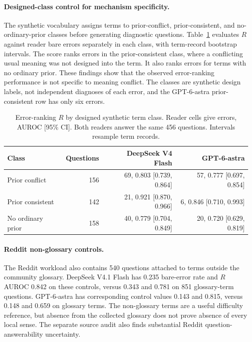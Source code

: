 \paragraph{Designed-class control for mechanism specificity.}\label{app:synthetic-control}
The synthetic vocabulary assigns terms to prior-conflict, prior-consistent, and no-ordinary-prior classes before generating diagnostic questions. Table~\ref{tab:synthetic-control} evaluates $R$ against reader bare errors separately in each class, with term-record bootstrap intervals. The score ranks errors in the prior-consistent class, where a conflicting usual meaning was not designed into the term. It also ranks errors for terms with no ordinary prior. These findings show that the observed error-ranking performance is not specific to meaning conflict. The classes are synthetic design labels, not independent diagnoses of each error, and the GPT-6-astra prior-consistent row has only six errors.

\begin{table}[h]\centering\small
\caption{Error-ranking $R$ by designed synthetic term class. Reader cells give errors, AUROC [95\% CI]. Both readers answer the same 456 questions. Intervals resample term records.}
\label{tab:synthetic-control}
\begin{tabular}{@{}lrrr@{}}\toprule
Class & Questions & DeepSeek V4 Flash & GPT-6-astra\\\midrule
Prior conflict & 156 & 69, 0.803 [0.739, 0.864] & 57, 0.777 [0.697, 0.854]\\
Prior consistent & 142 & 21, 0.921 [0.870, 0.966] & 6, 0.846 [0.710, 0.993]\\
No ordinary prior & 158 & 40, 0.779 [0.704, 0.849] & 20, 0.720 [0.629, 0.819]\\\bottomrule
\end{tabular}
\end{table}

\paragraph{Reddit non-glossary controls.}
The Reddit workload also contains 540 questions attached to terms outside the community glossary. DeepSeek V4.1 Flash has 0.235 bare-error rate and $R$ AUROC 0.842 on these controls, versus 0.343 and 0.781 on 851 glossary-term questions. GPT-6-astra has corresponding control values 0.143 and 0.815, versus 0.148 and 0.659 on glossary terms. The non-glossary terms are a useful difficulty reference, but absence from the collected glossary does not prove absence of every local sense. The separate source audit also finds substantial Reddit question-answerability uncertainty.
